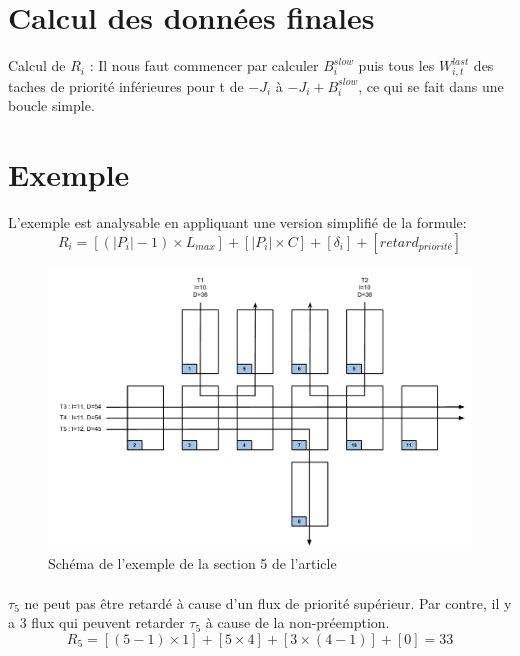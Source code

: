 \documentclass[10pt,a4paper]{article}
\newenvironment{figureH} {%
\begin{figure}[H]
}{%
\end{figure}
}
\begin{document}
\section{Calcul des données finales}
Calcul de $R_i$ : Il nous faut commencer par calculer $B_i^{slow}$ puis tous les $W_{i,t}^{last}$ 
des taches de priorité inférieures pour t de $-J_i$ à $-J_i + B_i^{slow}$, ce qui se fait dans 
une boucle simple.


\section{Exemple}
L'exemple est analysable en appliquant une version simplifié de la formule:
\[R_{i} = [(|P_i| - 1 ) \times L_{max}] + [|P_i| \times C] + [\delta_i]  + [retard_{priorité}]\]

\begin{figureH}
  \includegraphics[width=\textwidth]{images/global.pdf}
  \center
  \caption{Schéma de l'exemple de la section 5 de l'article}
  \label{image_global}
\end{figureH}

\paragraph{}
$\tau_5$ ne peut pas être retardé à cause d'un flux de priorité supérieur. Par contre, il y a 3 flux qui peuvent retarder $\tau_5$ à cause de la non-préemption.
\[ R_{5} = [(5-1) \times 1]  + [5 \times 4] + [3 \times (4-1)] + [0] = 33 \]
\end{document}
